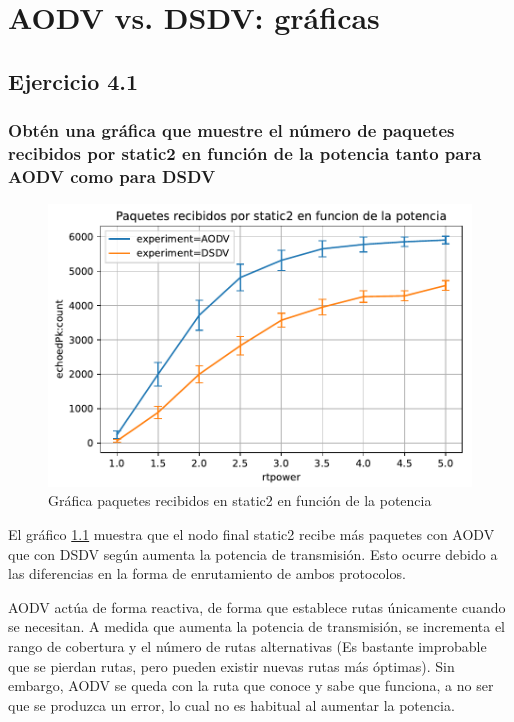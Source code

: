\chapter{AODV vs. DSDV: gráficas}
\label{chap:aodv_dsdv_graf}


\section{Ejercicio 4.1}
\subsection{Obtén una gráfica que muestre el número de paquetes recibidos por static2 en función de la potencia tanto
para AODV como para DSDV}

\begin{figure}[H]
    \centering
    \includegraphics{imaxes/graficas/ejer4_1.pdf}
    \caption{Gráfica paquetes recibidos en static2 en función de la potencia}
    \label{fig:ejer4_1}
\end{figure}

El gráfico \ref{fig:ejer4_1} muestra que el nodo final static2 recibe más paquetes con AODV que con DSDV según aumenta la potencia de transmisión. Esto ocurre debido a las diferencias en la forma de enrutamiento de ambos protocolos.

AODV actúa de forma reactiva, de forma que establece rutas únicamente cuando se necesitan. A medida que aumenta la potencia de transmisión, se incrementa el rango de cobertura y el número de rutas alternativas (Es bastante improbable que se pierdan rutas, pero pueden existir nuevas rutas más óptimas). Sin embargo, AODV se queda con la ruta que conoce y sabe que funciona, a no ser que se produzca un error, lo cual no es habitual al aumentar la potencia.

